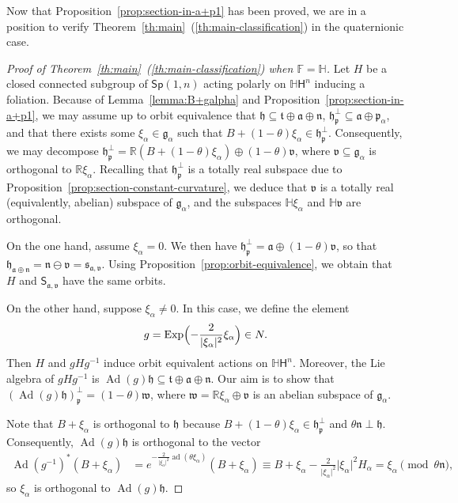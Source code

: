 \documentclass[12pt, a4paper]{amsart}
\newcommand{\g}{\mathfrak}
\newcommand{\s}{\mathsf}
\newcommand{\R}{\mathbb{R}}
\renewcommand{\H}{\mathbb{H}}
\newcommand{\F}{\mathbb{F}}
\newcommand{\ad}{\operatorname{ad}}
\newcommand{\Ad}{\operatorname{Ad}}
\newcommand{\Exp}{\operatorname{Exp}}
\theoremstyle{definition}
\begin{document}
Now that Proposition~\ref{prop:section-in-a+p1} has been proved,
we are in a position to verify Theorem~\ref{th:main}~(\ref{th:main-classification}) in the quaternionic case.

\begin{proof}[Proof of Theorem~\textup{\ref{th:main}~(\ref{th:main-classification})} when $\F=\H$]
Let $H$ be a closed connected subgroup of $\s{Sp}(1,n)$ acting polarly on $\H\s{H}^n$ inducing a foliation.
Because of Lemma~\ref{lemma:B+galpha} and Proposition~\ref{prop:section-in-a+p1}, we may assume up to orbit equivalence
that $\g{h}\subseteq\g{t}\oplus\g{a}\oplus\g{n}$,
$\g{h}_{\g{p}}^\perp\subseteq\g{a}\oplus\g{p}_\alpha$, and that there exists
some $\xi_\alpha\in \g{g}_\alpha$ such that $B+(1-\theta)\xi_\alpha\in\g{h}_\g{p}^\perp$.
Consequently, we may decompose $\g{h}_\g{p}^\perp=\R(B+(1-\theta)\xi_\alpha)\oplus(1-\theta)\g{v}$,
where $\g{v}\subseteq\g{g}_\alpha$ is orthogonal to $\R\xi_\alpha$.
Recalling that $\g{h}_\g{p}^\perp$ is a totally real subspace due to Proposition~\ref{prop:section-constant-curvature},
we deduce that $\g{v}$ is a totally real (equivalently, abelian)
subspace of $\g{g}_\alpha$, and the subspaces $\H\xi_\alpha$ and $\H\g{v}$
are orthogonal.

On the one hand, assume $\xi_\alpha=0$.
We then have $\g{h}_\g{p}^\perp=\g{a}\oplus(1-\theta)\g{v}$, so that
$\g{h}_{\g{a}\oplus\g{n}}=\g{n}\ominus\g{v}=\g{s}_{\g{a},\g{v}}$.
Using Proposition~\ref{prop:orbit-equivalence}, we obtain that $H$ and $\s{S}_{\g{a},\g{v}}$
have the same orbits.

On the other hand, suppose $\xi_\alpha\neq 0$.
In this case, we define the element
\[
g=\Exp\Bigl(-\frac{2}{\lvert\xi_\alpha\rvert^2}\xi_\alpha\Bigr)\in N.
\]
Then $H$ and $gHg^{-1}$ induce orbit equivalent actions on $\H\s{H}^n$.
Moreover, the Lie algebra of $gHg^{-1}$ is $\Ad(g)\g{h}\subseteq \g{t}\oplus\g{a}\oplus\g{n}$.
Our aim is to show that $(\Ad(g)\g{h})_{\g{p}}^\perp=(1-\theta)\g{w}$, where $\g{w}=\R\xi_\alpha\oplus\g{v}$
is an abelian subspace of $\g{g}_\alpha$.

Note that $B+\xi_\alpha$ is orthogonal to $\g{h}$ because
$B+(1-\theta)\xi_\alpha\in\g{h}_\g{p}^\perp$ and $\theta\g{n}\perp\g{h}$.
Consequently, $\Ad(g)\g{h}$ is orthogonal to the vector
\begin{align*}
    \Ad(g^{-1})^*(B+\xi_\alpha)
    &=
    e^{-\frac{2}{\lvert\xi_\alpha\rvert^2}\ad(\theta\xi_\alpha)}(B+\xi_\alpha)
    \equiv
    B+\xi_\alpha-\frac{2}{\lvert\xi_\alpha\rvert^2}\lvert\xi_\alpha\rvert^2H_\alpha
    =
    \xi_\alpha
    \pmod{\theta\g{n}},
\end{align*}
so $\xi_\alpha$ is orthogonal to $\Ad(g)\g{h}$.


\end{proof}
\end{document}
